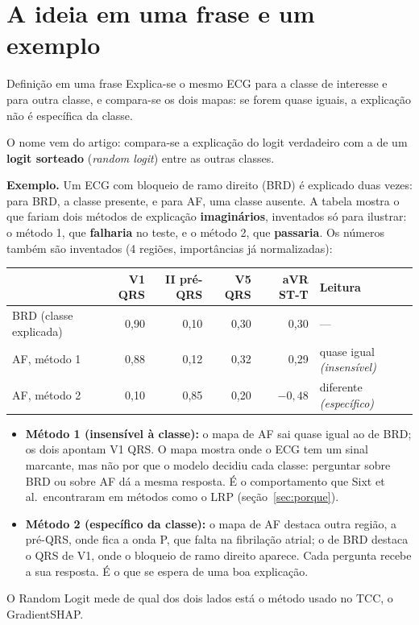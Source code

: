 \documentclass[11pt,a4paper]{article}
\begin{document}
\section{A ideia em uma frase e um exemplo}
\begin{infobox}[note]{Definição em uma frase}
Explica-se o mesmo ECG para a classe de interesse e para outra classe, e compara-se os dois mapas: se forem quase iguais, a explicação não é específica da classe.
\end{infobox}
O nome vem do artigo: compara-se a explicação do logit verdadeiro com a de um \textbf{logit sorteado} (\textit{random logit}) entre as outras classes.

\textbf{Exemplo.} Um ECG com bloqueio de ramo direito (BRD) é explicado duas vezes: para BRD, a classe presente, e para AF, uma classe ausente. A tabela mostra o que fariam dois métodos de explicação \textbf{imaginários}, inventados só para ilustrar: o método 1, que \textbf{falharia} no teste, e o método 2, que \textbf{passaria}. Os números também são inventados (4 regiões, importâncias já normalizadas):
\begin{center}\small
\begin{tabular}{lrrrrl}
\toprule
& \textbf{V1 QRS} & \textbf{II pré-QRS} & \textbf{V5 QRS} & \textbf{aVR ST-T} & \textbf{Leitura} \\
\midrule
BRD (classe explicada) & 0,90 & 0,10 & 0,30 & 0,30 & --- \\
AF, método 1 & 0,88 & 0,12 & 0,32 & 0,29 & quase igual \textit{(insensível)} \\
AF, método 2 & 0,10 & 0,85 & 0,20 & $-0{,}48$ & diferente \textit{(específico)} \\
\bottomrule
\end{tabular}
\end{center}
\begin{itemize}
\item \textbf{Método 1 (insensível à classe):} o mapa de AF sai quase igual ao de BRD; os dois apontam V1 QRS. O mapa mostra onde o ECG tem um sinal marcante, mas não por que o modelo decidiu cada classe: perguntar sobre BRD ou sobre AF dá a mesma resposta. É o comportamento que Sixt et al.\ encontraram em métodos como o LRP (seção~\ref{sec:porque}).
\item \textbf{Método 2 (específico da classe):} o mapa de AF destaca outra região, a pré-QRS, onde fica a onda P, que falta na fibrilação atrial; o de BRD destaca o QRS de V1, onde o bloqueio de ramo direito aparece. Cada pergunta recebe a sua resposta. É o que se espera de uma boa explicação.
\end{itemize}
O Random Logit mede de qual dos dois lados está o método usado no TCC, o GradientSHAP.
\end{document}
